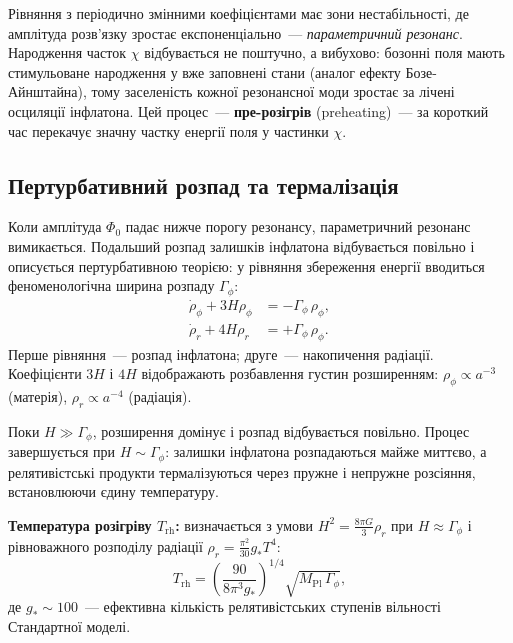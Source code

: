 \documentclass[12pt, a4paper]{article}
\begin{document}
Рівняння з періодично змінними коефіцієнтами має зони
нестабільності, де амплітуда розв'язку зростає
експоненціально~--- \emph{параметричний резонанс}.
Народження часток $\chi$ відбувається не поштучно, а
вибухово: бозонні поля мають стимульоване народження у
вже заповнені стани (аналог ефекту Бозе-Айнштайна), тому
заселеність кожної резонансної моди зростає за лічені
осциляції інфлатона. Цей процес~--- \textbf{пре-розігрів}
(preheating)~--- за короткий час перекачує значну частку
енергії поля у частинки $\chi$.

\subsection{Пертурбативний розпад та термалізація}

Коли амплітуда $\Phi_0$ падає нижче порогу резонансу,
параметричний резонанс вимикається. Подальший розпад
залишків інфлатона відбувається повільно і описується
пертурбативною теорією: у рівняння збереження енергії
вводиться феноменологічна ширина розпаду $\Gamma_\phi$:
\begin{align}
  \dot{\rho}_\phi + 3H\rho_\phi
    &= -\Gamma_\phi\,\rho_\phi,
    \label{eq:reheat_rho_phi} \\
  \dot{\rho}_r + 4H\rho_r
    &= +\Gamma_\phi\,\rho_\phi.
    \label{eq:reheat_rho_r}
\end{align}
Перше рівняння~--- розпад інфлатона; друге~--- накопичення
радіації. Коефіцієнти $3H$ і $4H$ відображають розбавлення
густин розширенням: $\rho_\phi \propto a^{-3}$ (матерія),
$\rho_r \propto a^{-4}$ (радіація).

Поки $H \gg \Gamma_\phi$, розширення домінує і розпад
відбувається повільно. Процес завершується при
$H \sim \Gamma_\phi$: залишки інфлатона розпадаються майже
миттєво, а релятивістські продукти термалізуються через
пружне і непружне розсіяння, встановлюючи єдину температуру.

\begin{keybox}
\textbf{Температура розігріву $T_\mathrm{rh}$:}
визначається з умови $H^2 = \frac{8\pi G}{3}\rho_r$ при
$H \approx \Gamma_\phi$ і рівноважного розподілу радіації
$\rho_r = \frac{\pi^2}{30}g_* T^4$:
\begin{equation}\label{eq:t_reheating}
  T_\mathrm{rh}
    = \left(\frac{90}{8\pi^3 g_*}\right)^{\!1/4}
      \sqrt{M_\mathrm{Pl}\,\Gamma_\phi},
\end{equation}
де $g_* \sim 100$~--- ефективна кількість
релятивістських ступенів вільності Стандартної моделі.
\end{keybox}
\end{document}
